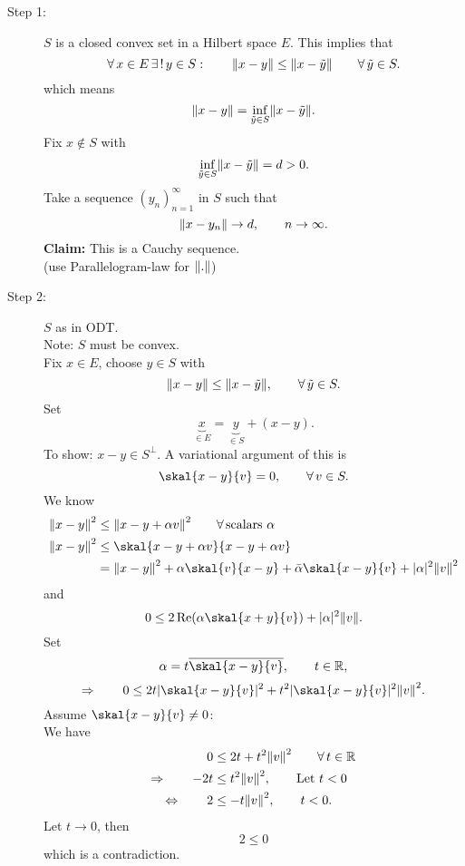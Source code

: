 \begin{beweis}
	\begin{description}
		\item[Step 1:] $S$ is a closed convex set in a Hilbert space $E$. This implies that 
		\[
			\forall\,  x \in E \, \exists\,! \,y \in S: \qquad \norm{x-y} \leq \norm{x- \tilde y} \qquad \forall\, \tilde y \in S.
		\] 
		which means
		\[
			\norm{x-y} = \inf_{\tilde y \in S}\norm{x-\tilde y}.
		\]
		Fix $x \not \in S$ with
		\[
			\inf_{ \tilde y \in S} \norm{x- \tilde y} = d > 0.
		\]
		Take a sequence $(y_n)_{n=1}^{\infty}$ in $S$ such that 
		\[
			\norm{x-y_n} \to d, \qquad n \to \infty.
		\]
		\textbf{Claim:} \text{    } This is a Cauchy sequence. \\
		(use Parallelogram-law for $\norm{.}$)
		\item[Step 2:] $S$ as in ODT. \\
		Note: $S$ must be convex. \\
		Fix $x \in E$, choose $y \in S$ with
		\[
			\norm{x-y} \leq  \norm{x- \tilde y}, \qquad \forall\,  \tilde y \in S.
		\]
		Set
		\[
			\underset{\in E}{\underbrace{x}} = \underset{\in S}{\underbrace{y}} + (x-y).
		\]
		To show: $x-y \in S^{\perp}$. A variational argument of this is 
		\[
			\skal{x-y}{v}= 0, \qquad \forall\, v \in S.
		\]
		We know
		\begin{align*}
			\norm{x-y}^2 &\leq \norm{x-y + \alpha v}^2 \qquad \forall\, \text{scalars }\alpha \\
			\norm{x-y}^2 &\leq \skal{x-y+\alpha v}{x-y+ \alpha v} \\
			&= \norm{x-y}^2+ \alpha \skal{v}{x-y} + \bar{\alpha} \skal{x-y}{v} + \abs{\alpha}^2 \norm{v}^2
		\end{align*}
		and
		\[
			0 \leq 2 \re( \alpha \skal{x+y}{v}) + \abs{\alpha}^2 \norm{v}.
		\]
		Set 
		\[
			\alpha = t \overline{\skal{x-y}{v}}, \qquad t \in \mathbb{R},
		\]
		\[
			\Rightarrow \qquad 0 \leq  2 t \abs{\skal{x-y}{v}}^2 + t^2 \abs{\skal{x-y}{v}}^2 \norm{v}^2.
		\]
		Assume $\skal{x-y}{v} \neq 0$: \\
		We have 
		\begin{align*}
			0 &\leq 2t + t^2 \norm{v}^2 \qquad \forall\, t \in \mathbb{R} \\
			\Rightarrow \qquad -2t &\leq  t^2 \norm{v}^2, \qquad \text{Let }t <0 \\
			\Leftrightarrow \qquad 2 &\leq -t \norm{v}^2, \qquad t<0.
		\end{align*}
		Let $t \to 0$, then
		\[
			2 \leq 0
		\]
		which is a contradiction.
	\end{description}
\end{beweis}
